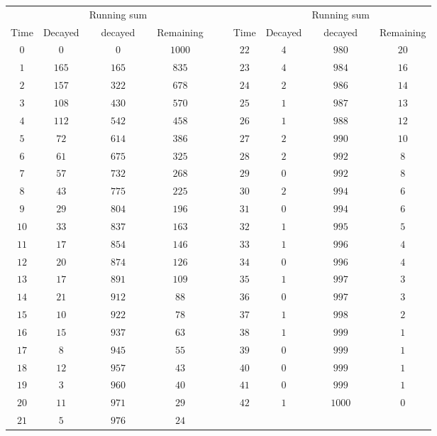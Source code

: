 \begin{tabular}{ccccrrcccc} \toprule
     &         & Running sum &           &&&      &         & Running sum &           \\
Time & Decayed & decayed     & Remaining &&& Time & Decayed & decayed     & Remaining \\\midrule
$0$  & $0$     & $0$         & $1000$    &&& $22$ & $4$     & $980$       & $20$      \\[4pt]
$1$  & $165$   & $165$       & $835$     &&& $23$ & $4$     & $984$       & $16$      \\[4pt]
$2$  & $157$   & $322$       & $678$     &&& $24$ & $2$     & $986$       & $14$      \\[4pt]
$3$  & $108$   & $430$       & $570$     &&& $25$ & $1$     & $987$       & $13$      \\[4pt]
$4$  & $112$   & $542$       & $458$     &&& $26$ & $1$     & $988$       & $12$      \\[4pt]
$5$  & $72$    & $614$       & $386$     &&& $27$ & $2$     & $990$       & $10$      \\[4pt]
$6$  & $61$    & $675$       & $325$     &&& $28$ & $2$     & $992$       & $8$       \\[4pt]
$7$  & $57$    & $732$       & $268$     &&& $29$ & $0$     & $992$       & $8$       \\[4pt]
$8$  & $43$    & $775$       & $225$     &&& $30$ & $2$     & $994$       & $6$       \\[4pt]
$9$  & $29$    & $804$       & $196$     &&& $31$ & $0$     & $994$       & $6$       \\[4pt]
$10$ & $33$    & $837$       & $163$     &&& $32$ & $1$     & $995$       & $5$       \\[4pt]
$11$ & $17$    & $854$       & $146$     &&& $33$ & $1$     & $996$       & $4$       \\[4pt]
$12$ & $20$    & $874$       & $126$     &&& $34$ & $0$     & $996$       & $4$       \\[4pt]
$13$ & $17$    & $891$       & $109$     &&& $35$ & $1$     & $997$       & $3$       \\[4pt]
$14$ & $21$    & $912$       & $88$      &&& $36$ & $0$     & $997$       & $3$       \\[4pt]
$15$ & $10$    & $922$       & $78$      &&& $37$ & $1$     & $998$       & $2$       \\[4pt]
$16$ & $15$    & $937$       & $63$      &&& $38$ & $1$     & $999$       & $1$       \\[4pt]
$17$ & $8$     & $945$       & $55$      &&& $39$ & $0$     & $999$       & $1$       \\[4pt]
$18$ & $12$    & $957$       & $43$      &&& $40$ & $0$     & $999$       & $1$       \\[4pt]
$19$ & $3$     & $960$       & $40$      &&& $41$ & $0$     & $999$       & $1$       \\[4pt]
$20$ & $11$    & $971$       & $29$      &&& $42$ & $1$     & $1000$      & $0$       \\[4pt]
$21$ & $5$     & $976$       & $24$ \\\bottomrule
\end{tabular}

